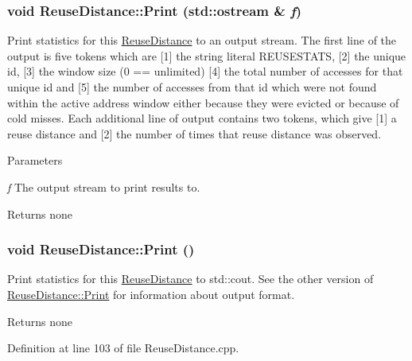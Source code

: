 \hypertarget{class_reuse_distance_ac798c03bb891a51a6648df4b49e25212}{
\subsubsection[{Print}]{\setlength{\rightskip}{0pt plus 5cm}void ReuseDistance::Print (std::ostream \& {\em f})}}
\label{class_reuse_distance_ac798c03bb891a51a6648df4b49e25212}
Print statistics for this \hyperlink{class_reuse_distance}{ReuseDistance} to an output stream. The first line of the output is five tokens which are \mbox{[}1\mbox{]} the string literal REUSESTATS, \mbox{[}2\mbox{]} the unique id, \mbox{[}3\mbox{]} the window size (0 == unlimited) \mbox{[}4\mbox{]} the total number of accesses for that unique id and \mbox{[}5\mbox{]} the number of accesses from that id which were not found within the active address window either because they were evicted or because of cold misses. Each additional line of output contains two tokens, which give \mbox{[}1\mbox{]} a reuse distance and \mbox{[}2\mbox{]} the number of times that reuse distance was observed.


\begin{DoxyParams}{Parameters}
\item[{\em f}]The output stream to print results to.\end{DoxyParams}
\begin{DoxyReturn}{Returns}
none 
\end{DoxyReturn}
\hypertarget{class_reuse_distance_a0cbab308f0c9262e570b994beac0544a}{
\subsubsection[{Print}]{\setlength{\rightskip}{0pt plus 5cm}void ReuseDistance::Print ()}}
\label{class_reuse_distance_a0cbab308f0c9262e570b994beac0544a}
Print statistics for this \hyperlink{class_reuse_distance}{ReuseDistance} to std::cout. See the other version of \hyperlink{class_reuse_distance_a0cbab308f0c9262e570b994beac0544a}{ReuseDistance::Print} for information about output format.

\begin{DoxyReturn}{Returns}
none 
\end{DoxyReturn}


Definition at line 103 of file ReuseDistance.cpp.

